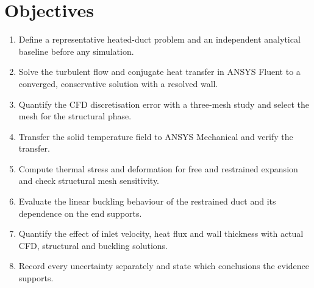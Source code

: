 \section{Objectives}
\begin{enumerate}
\item Define a representative heated-duct problem and an independent analytical baseline before any simulation.
\item Solve the turbulent flow and conjugate heat transfer in ANSYS Fluent to a converged, conservative solution with a resolved wall.
\item Quantify the CFD discretisation error with a three-mesh study and select the mesh for the structural phase.
\item Transfer the solid temperature field to ANSYS Mechanical and verify the transfer.
\item Compute thermal stress and deformation for free and restrained expansion and check structural mesh sensitivity.
\item Evaluate the linear buckling behaviour of the restrained duct and its dependence on the end supports.
\item Quantify the effect of inlet velocity, heat flux and wall thickness with actual CFD, structural and buckling solutions.
\item Record every uncertainty separately and state which conclusions the evidence supports.
\end{enumerate}
